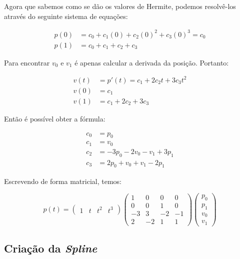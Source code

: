 Agora que sabemos como se dão os valores de Hermite, podemos resolvê-los através do seguinte sistema de equações:

\begin{align}
    p(0) &= c_0 + c_1(0) + c_2(0)^2 + c_3(0)^3 = c_0 \\
    p(1) &= c_0 + c_1 + c_2 + c_3
\end{align}


Para encontrar $v_0$ e $v_1$ é apenas calcular a derivada da posição. Portanto:

\begin{align}
    v(t) &= p'(t) = c_1 + 2c_2t + 3c_3t^2\\
    v(0) &= c_1\\
    v(1) &= c_1 + 2c_2 + 3c_3
\end{align}

Então é possível obter a fórmula:

\begin{align}
    c_0 &= p_0\\
    c_1 &= v_0\\
    c_2 &= -3p_0 - 2v_0 - v_1 + 3p_1\\
    c_3 &= 2p_0 + v_0 + v_1 - 2p_1
\end{align}

Escrevendo de forma matricial, temos:

\begin{equation}
    p(t) =  
        \left(
        \begin{array}{rrrr}
            1 & t & t^2 & t^3
        \end{array}\right)
        \left(
        \begin{array}{rrrr}
            1 & 0 & 0 & 0 \\
            0 & 0 & 1 & 0 \\
            -3 & 3 & -2 & -1 \\
                2 & -2 & 1 & 1
        \end{array}\right)
    \left(
        \begin{array}{r}
            p_0 \\
            p_1 \\
            v_0 \\
                v_1
        \end{array}\right)
 \end{equation}

 \subsection{Criação da \textit{Spline}}

